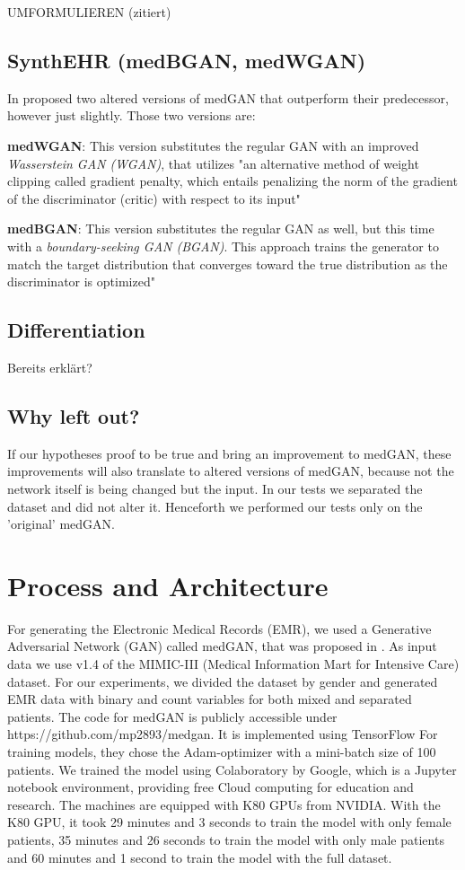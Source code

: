 \documentclass[11pt, a4paper]{book}
\begin{document}
UMFORMULIEREN (zitiert)

\subsection{SynthEHR (medBGAN, medWGAN)}
In \cite{Baowaly2018} proposed two altered versions of medGAN that outperform their predecessor, however just slightly.
Those two versions are:

\textbf{medWGAN}: This version substitutes the regular GAN with an improved \textit{Wasserstein GAN (WGAN)}, that utilizes "an alternative method of weight clipping called gradient penalty, which entails penalizing the norm of the gradient of the discriminator (critic) with respect to its input" \cite{Baowaly2018}

\textbf{medBGAN}: This version substitutes the regular GAN as well, but this time with a \textit{boundary-seeking GAN (BGAN)}. This approach trains the generator to match the target distribution that converges toward the true distribution as the discriminator is optimized" \cite{Baowaly2018}
\subsection{Differentiation}
Bereits erklärt?
\subsection{Why left out?}
If our hypotheses proof to be true and bring an improvement to medGAN, these improvements will also translate to altered versions of medGAN, because not the network itself is being changed but the input. In our tests we separated the dataset and did not alter it. Henceforth we performed our tests only on the 'original' medGAN. 
\section{Process and Architecture}
For generating the Electronic Medical Records (EMR), we used a Generative Adversarial Network (GAN) called medGAN, that was proposed in \cite{Choi2017}. As input data we use v1.4 of the MIMIC-III (Medical Information Mart for Intensive Care) dataset. For our experiments, we divided the dataset by gender and generated EMR data with binary and count variables for both mixed and separated patients. The code for medGAN is publicly accessible under https://github.com/mp2893/medgan. It is implemented using TensorFlow
For training models, they chose the Adam-optimizer with a mini-batch size of 100 patients. \cite{Choi2017} We trained the model using Colaboratory by Google, which is a Jupyter notebook environment, providing free Cloud computing for education and research.
The machines are equipped with K80 GPUs from NVIDIA.
With the K80 GPU, it took 29 minutes and 3 seconds to train the model with only female patients, 35 minutes and 26 seconds to train the model with only male patients and 60 minutes and 1 second to train the model with the full dataset.
\end{document}
